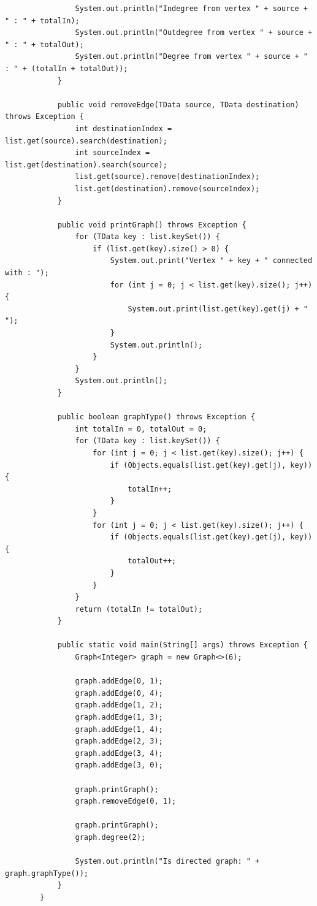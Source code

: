 \documentclass[12pt,titlepage]{article}
\begin{document}
\begin{enumerate}
\begin{verbatim}
                System.out.println("Indegree from vertex " + source + " : " + totalIn);
                System.out.println("Outdegree from vertex " + source + " : " + totalOut);
                System.out.println("Degree from vertex " + source + " : " + (totalIn + totalOut));
            }

            public void removeEdge(TData source, TData destination) throws Exception {
                int destinationIndex = list.get(source).search(destination);
                int sourceIndex = list.get(destination).search(source);
                list.get(source).remove(destinationIndex);
                list.get(destination).remove(sourceIndex);
            }

            public void printGraph() throws Exception {
                for (TData key : list.keySet()) {
                    if (list.get(key).size() > 0) {
                        System.out.print("Vertex " + key + " connected with : ");
                        for (int j = 0; j < list.get(key).size(); j++) {
                            System.out.print(list.get(key).get(j) + " ");
                        }
                        System.out.println();
                    }
                }
                System.out.println();
            }

            public boolean graphType() throws Exception {
                int totalIn = 0, totalOut = 0;
                for (TData key : list.keySet()) {
                    for (int j = 0; j < list.get(key).size(); j++) {
                        if (Objects.equals(list.get(key).get(j), key)) {
                            totalIn++;
                        }
                    }
                    for (int j = 0; j < list.get(key).size(); j++) {
                        if (Objects.equals(list.get(key).get(j), key)) {
                            totalOut++;
                        }
                    }
                }
                return (totalIn != totalOut);
            }

            public static void main(String[] args) throws Exception {
                Graph<Integer> graph = new Graph<>(6);

                graph.addEdge(0, 1);
                graph.addEdge(0, 4);
                graph.addEdge(1, 2);
                graph.addEdge(1, 3);
                graph.addEdge(1, 4);
                graph.addEdge(2, 3);
                graph.addEdge(3, 4);
                graph.addEdge(3, 0);

                graph.printGraph();
                graph.removeEdge(0, 1);

                graph.printGraph();
                graph.degree(2);
                
                System.out.println("Is directed graph: " + graph.graphType());
            }
        }
    \end{verbatim}
\end{enumerate}
\end{document}
